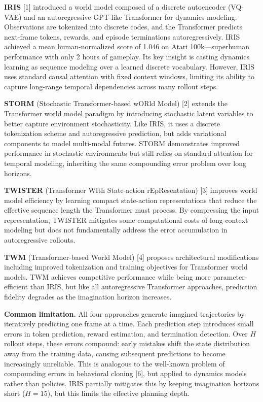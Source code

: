 \documentclass[10pt, letterpaper]{article}
\begin{document}
\textbf{IRIS} [1] introduced a world model composed of a discrete autoencoder (VQ-VAE) and an autoregressive GPT-like Transformer for dynamics modeling. Observations are tokenized into discrete codes, and the Transformer predicts next-frame tokens, rewards, and episode terminations autoregressively. IRIS achieved a mean human-normalized score of 1.046 on Atari 100k---superhuman performance with only 2 hours of gameplay. Its key insight is casting dynamics learning as sequence modeling over a learned discrete vocabulary. However, IRIS uses standard causal attention with fixed context windows, limiting its ability to capture long-range temporal dependencies across many rollout steps.

\textbf{STORM} (Stochastic Transformer-based wORld Model) [2] extends the Transformer world model paradigm by introducing stochastic latent variables to better capture environment stochasticity. Like IRIS, it uses a discrete tokenization scheme and autoregressive prediction, but adds variational components to model multi-modal futures. STORM demonstrates improved performance in stochastic environments but still relies on standard attention for temporal modeling, inheriting the same compounding error problem over long horizons.

\textbf{TWISTER} (Transformer WIth State-action rEpResentation) [3] improves world model efficiency by learning compact state-action representations that reduce the effective sequence length the Transformer must process. By compressing the input representation, TWISTER mitigates some computational costs of long-context modeling but does not fundamentally address the error accumulation in autoregressive rollouts.

\textbf{TWM} (Transformer-based World Model) [4] proposes architectural modifications including improved tokenization and training objectives for Transformer world models. TWM achieves competitive performance while being more parameter-efficient than IRIS, but like all autoregressive Transformer approaches, prediction fidelity degrades as the imagination horizon increases.

\textbf{Common limitation.} All four approaches generate imagined trajectories by iteratively predicting one frame at a time. Each prediction step introduces small errors in token prediction, reward estimation, and termination detection. Over $H$ rollout steps, these errors compound: early mistakes shift the state distribution away from the training data, causing subsequent predictions to become increasingly unreliable. This is analogous to the well-known problem of compounding errors in behavioral cloning [6], but applied to dynamics models rather than policies. IRIS partially mitigates this by keeping imagination horizons short ($H = 15$), but this limits the effective planning depth.
\end{document}
